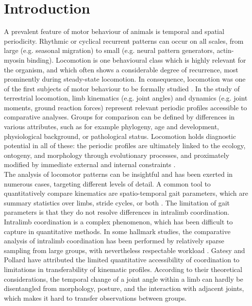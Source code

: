\section{Introduction}
A prevalent feature of motor behaviour of animals is temporal and spatial periodicity.
Rhythmic or cyclical recurrent patterns can occur on all scales, from large (e.g. seasonal migration) to small (e.g. neural pattern generators, actin-myosin binding).
Locomotion is one behavioural class which is highly relevant for the organism, and which often shows a considerable degree of recurrence, most prominently during steady-state locomotion.
In consequence, locomotion was one of the first subjects of motor behaviour to be formally studied \citep{Marey1878,Muybridge1893,Braune1904,Bernstein1927a,Bernstein1927b}.
In the study of terrestrial locomotion, limb kinematics (e.g. joint angles) and dynamics (e.g. joint moments, ground reaction forces) represent relevant periodic profiles accessible to comparative analyses.
Groups for comparison can be defined by differences in various attributes, such as for example phylogeny, age and development, physiological background, or pathological status.
Locomotion holds diagnostic potential in all of these: the periodic profiles are ultimately linked to the ecology, ontogeny, and morphology through evolutionary processes, and proximately modified by immediate external and internal constraints \cite[e.g.][]{Barrett2008,McGibbon2003,Mohling2014,Nyakatura2012,Nyakatura2019,Vanhooydonck2014,VandenHole2018}.
\\The analysis of locomotor patterns can be insightful and has been exerted in numerous cases, targeting different levels of detail.
A common tool to quantitatively compare kinematics are spatio-temporal gait parameters, which are summary statistics over limbs, stride cycles, or both \cite[see e.g.][]{Christiansen2002,Biancardi2012}.
The limitation of gait parameters is that they do not resolve differences in intralimb coordination.
Intralimb coordination is a complex phenomenon, which has been difficult to capture in quantitative methods.
In some hallmark studies, the comparative analysis of intralimb coordination has been performed by relatively sparse sampling from large groups, with nevertheless respectable workload \citep{Stoessel2012,Fischer2002,Isler2005}.
Gatesy and Pollard \cite[2011, ][]{Gatesy2011} have attributed the limited quantitative accessibility of coordination to limitations in transferability of kinematic profiles.
According to their theoretical considerations, the temporal change of a joint angle within a limb can hardly be disentangled from morphology, posture, and the interaction with adjacent joints, which makes it hard to transfer observations between groups.
